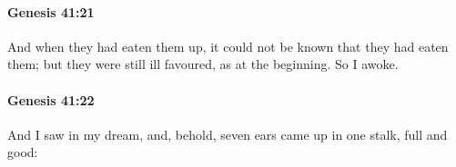 		\paragraph{Genesis 41:21} %
			\label{GENESIS-41-21}

			And when they had eaten them up, it could not be known that they had eaten them; but they were still ill favoured, as at the beginning. So I awoke.


		\paragraph{Genesis 41:22} %
			\label{GENESIS-41-22}

			And I saw in my dream, and, behold, seven ears came up in one stalk, full and good:


